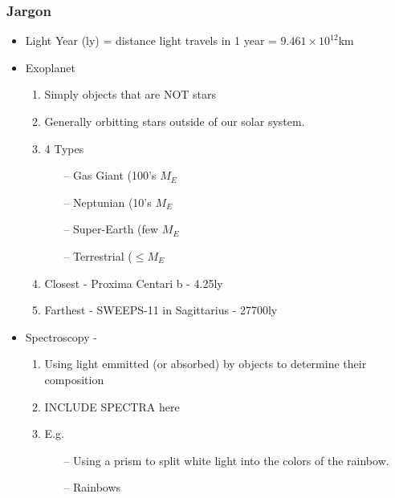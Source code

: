 \documentclass{beamer}
\begin{document}
\begin{frame}
\frametitle{Jargon}
\begin{itemize}
    \item Light Year (ly) = distance light travels in 1 year = $9.461\times 10^{12}$km
    \pause
    \item Exoplanet
    \pause
    \begin{enumerate}
        \item Simply objects that are NOT stars
        \pause 
        \item Generally orbitting stars outside of our solar system.
        \pause
        \item 4 Types
        \begin{itemize}
            \item[--] Gas Giant (100's $M_{E}$
            \pause
            \item[--] Neptunian (10's $M_{E}$
            \pause
            \item[--] Super-Earth (few $M_{E}$
            \pause
            \item[--] Terrestrial ($\leq M_{E}$
        \end{itemize}
        \pause
        \item Closest - Proxima Centari b - 4.25ly
        \pause
        \item Farthest - SWEEPS-11 in Sagittarius - 27700ly
    \end{enumerate}
    \item Spectroscopy -
    \begin{enumerate}
        \item Using light emmitted (or absorbed) by objects to determine their composition
        \pause
        \item INCLUDE SPECTRA here
        \pause 
        \item E.g.
        \begin{itemize}
            \item[--] Using a prism to split white light into the colors of the rainbow.
            \pause
            \item[--] Rainbows
        \end{itemize}
    \end{enumerate}
    \pause
\end{itemize}
\end{frame}
\end{document}
